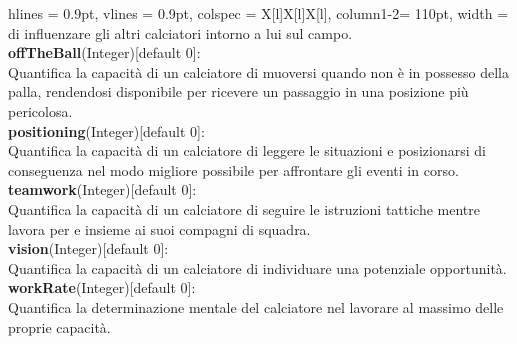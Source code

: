 \begin{tblr}{
    hlines = {0.9pt}, vlines = {0.9pt}, colspec = {X[l]X[l]X[l]}, column{1-2}= {110pt},
    width = \textwidth
}
{			di influenzare gli altri calciatori
			intorno a lui sul campo.\\
		\medskip\textbf{offTheBall}(Integer)[default 0]:\\
			Quantifica la capacità di un calciatore
			di muoversi quando non è in possesso della palla,
			rendendosi disponibile per ricevere un passaggio
			in una posizione più pericolosa.\\
		\medskip\textbf{positioning}(Integer)[default 0]:\\
			Quantifica la capacità di un calciatore di leggere
			le situazioni e posizionarsi di conseguenza
			nel modo migliore possibile per affrontare
			gli eventi in corso.\\
		\medskip\textbf{teamwork}(Integer)[default 0]:\\
			Quantifica la capacità di un calciatore
			di seguire le istruzioni tattiche
			mentre lavora per e insieme
			ai suoi compagni di squadra.\\
		\medskip\textbf{vision}(Integer)[default 0]:\\
			Quantifica la capacità di un calciatore
			di individuare una potenziale opportunità.\\
		\medskip\textbf{workRate}(Integer)[default 0]:\\
			Quantifica la determinazione mentale del calciatore
			nel lavorare al massimo delle proprie capacità.
	}
	\\
\end{tblr}

\newpage

